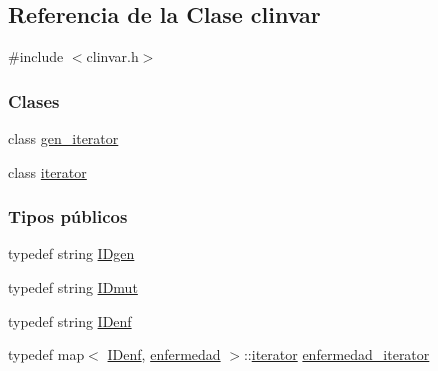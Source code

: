\hypertarget{classclinvar}{}\subsection{Referencia de la Clase clinvar}
\label{classclinvar}


{\ttfamily \#include $<$clinvar.\+h$>$}

\subsubsection*{Clases}
\begin{DoxyCompactItemize}
\item 
class \hyperlink{classclinvar_1_1gen__iterator}{gen\+\_\+iterator}
\item 
class \hyperlink{classclinvar_1_1iterator}{iterator}
\end{DoxyCompactItemize}
\subsubsection*{Tipos públicos}
\begin{DoxyCompactItemize}
\item 
typedef string \hyperlink{classclinvar_aa6cdb39378649a250def3e20163d3113}{I\+Dgen}
\item 
typedef string \hyperlink{classclinvar_a4ad33b1d063a729b56ea6ed9e4e2700d}{I\+Dmut}
\item 
typedef string \hyperlink{classclinvar_a2c121e1c9c137330a57590fe9f4e65ab}{I\+Denf}
\item 
typedef map$<$ \hyperlink{classclinvar_a2c121e1c9c137330a57590fe9f4e65ab}{I\+Denf}, \hyperlink{classenfermedad}{enfermedad} $>$\+::\hyperlink{classclinvar_1_1iterator}{iterator} \hyperlink{classclinvar_a4e04baa8b244566f2c25347c18f036b0}{enfermedad\+\_\+iterator}
\end{DoxyCompactItemize}
